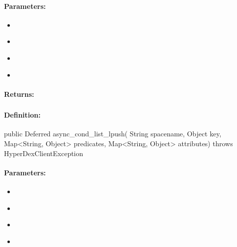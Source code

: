 \paragraph{Parameters:}
\begin{itemize}[noitemsep]
\item {}\\

\item {}\\

\item {}\\

\item {}\\

\end{itemize}

\paragraph{Returns:}


\pagebreak
\subsubsection{}
\label{api:java:async_cond_list_lpush}


\paragraph{Definition:}
\begin{javacode}
public Deferred async_cond_list_lpush(
        String spacename,
        Object key,
        Map<String, Object> predicates,
        Map<String, Object> attributes) throws HyperDexClientException
\end{javacode}

\paragraph{Parameters:}
\begin{itemize}[noitemsep]
\item {}\\

\item {}\\

\item {}\\

\item {}\\

\end{itemize}

